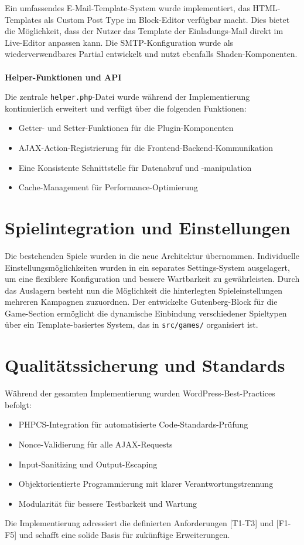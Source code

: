 Ein umfassendes E-Mail-Template-System wurde implementiert, das HTML-Templates als Custom Post Type im Block-Editor verfügbar macht.
Dies bietet die Möglichkeit, dass der Nutzer das Template der Einladungs-Mail direkt im Live-Editor anpassen kann.
Die SMTP-Konfiguration wurde als wiederverwendbares Partial entwickelt und nutzt ebenfalls Shadcn-Komponenten.
\\\\
\textbf{Helper-Funktionen und API}

Die zentrale \texttt{helper.php}-Datei wurde während der Implementierung kontinuierlich erweitert und verfügt über die folgenden Funktionen:

\begin{itemize}
    \item Getter- und Setter-Funktionen für die Plugin-Komponenten
    \item AJAX-Action-Registrierung für die Frontend-Backend-Kommunikation
    \item Eine Konsistente Schnittstelle für Datenabruf und -manipulation
    \item Cache-Management für Performance-Optimierung
\end{itemize}

\section{Spielintegration und Einstellungen}
Die bestehenden Spiele wurden in die neue Architektur übernommen.
Individuelle Einstellungsmöglichkeiten wurden in ein separates Settings-System ausgelagert, um eine flexiblere Konfiguration und bessere Wartbarkeit zu gewährleisten.
Durch das Auslagern besteht nun die Möglichkeit die hinterlegten Spieleinstellungen mehreren Kampagnen zuzuordnen.
Der entwickelte Gutenberg-Block für die Game-Section ermöglicht die dynamische Einbindung verschiedener Spieltypen über ein Template-basiertes System, das in \texttt{src/games/} organisiert ist.

\section{Qualitätssicherung und Standards}
Während der gesamten Implementierung wurden WordPress-Best-Practices befolgt:

\begin{itemize}
    \item PHPCS-Integration für automatisierte Code-Standards-Prüfung
    \item Nonce-Validierung für alle AJAX-Requests
    \item Input-Sanitizing und Output-Escaping
    \item Objektorientierte Programmierung mit klarer Verantwortungstrennung
    \item Modularität für bessere Testbarkeit und Wartung
\end{itemize}

Die Implementierung adressiert die definierten Anforderungen [T1-T3] und [F1-F5] und schafft eine solide Basis für zukünftige Erweiterungen.
